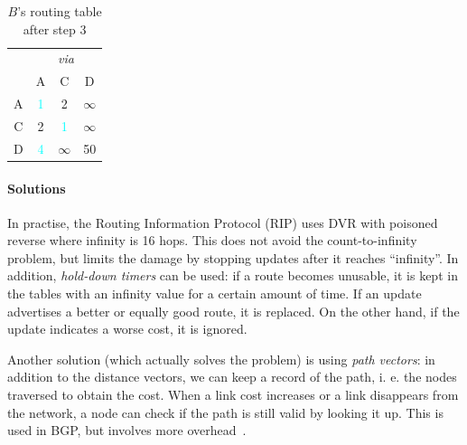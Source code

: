 \documentclass[12pt,a4paper]{article}
\begin{document}
\begin{table}[!ht]
\centering
\begin{tabular}{c|ccc}
	& \multicolumn{3}{c}{\textit{via}} 						\\
	&	A			&	C			&	D					\\
\hline
A	& 	\textcolor{Cyan}{1}	&	2			&	$\infty$	\\
C	&	2			&	\textcolor{Cyan}{1}	&	$\infty$	\\
D	&	\textcolor{Cyan}{4}	&	$\infty$	&	50			\\
\end{tabular}
\caption{$B$'s routing table after step 3}
\label{tab:step3}
\end{table}

\paragraph{Solutions}
In practise, the Routing Information Protocol (RIP) uses DVR with poisoned reverse where infinity is 16 hops. This does not avoid the count-to-infinity problem, but limits the damage by stopping updates after it reaches ``infinity''.
In addition, \textit{hold-down timers} can be used: if a route becomes unusable, it is kept in the tables with an infinity value for a certain amount of time. If an update advertises a better or equally good route, it is replaced. On the other hand, if the update indicates a worse cost, it is ignored.~\cite{holddown}

Another solution (which actually solves the problem) is using \textit{path vectors}: in addition to the distance vectors, we can keep a record of the path, i. e. the nodes traversed to obtain the cost. When a link cost increases or a link disappears from the network, a node can check if the path is still valid by looking it up. This is used in BGP, but involves more overhead~\cite{mit}.



\nocite{*}
    
\end{document}
